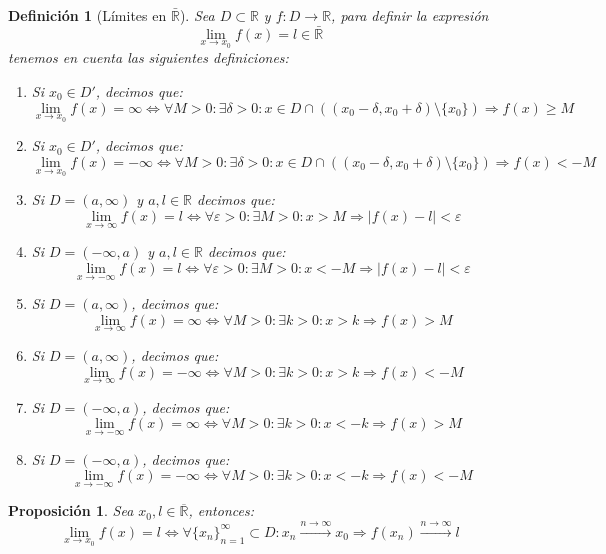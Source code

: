 \documentclass[10pt,a4paper,openright]{book}
\theoremstyle{break}
\newtheorem*{defi}{Definición}
\newtheorem*{prop}{Proposición}
\begin{document}
\begin{defi}[Límites en $\bar{\mathbb{R}}$]
Sea $D\subset \mathbb R$ y $f: D\longrightarrow \mathbb R$, para definir la expresión
$$\lim_{x\rightarrow x_0}f(x) = l \in \bar{\mathbb{R}}$$
tenemos en cuenta las siguientes definiciones:
\begin{enumerate}
\item Si $x_0\in D'$, decimos que:
$$\lim_{x\rightarrow x_0}f(x)=\infty\Leftrightarrow\forall M>0: \exists \delta>0: x\in D\cap \left((x_0-\delta, x_0+\delta)\mbox{\textbackslash}\{x_0\}\right)\Rightarrow f(x)\geq M$$

\item Si $x_0\in D'$, decimos que:
$$\lim_{x\rightarrow x_0}f(x)=-\infty \Leftrightarrow\forall M>0: \exists \delta>0: x\in D\cap \left((x_0-\delta, x_0+\delta)\mbox{\textbackslash}\{x_0\}\right)\Rightarrow f(x)<-M$$

\item Si $D=(a, \infty)$ y $a,l\in \mathbb R$ decimos que:
$$\lim_{x\rightarrow \infty}f(x)=l\Leftrightarrow \forall \varepsilon>0: \exists M>0: x>M\Rightarrow |f(x)-l|<\varepsilon$$

\item Si $D=(-\infty, a)$ y $a,l\in \mathbb R$ decimos que:
$$\lim_{x\rightarrow -\infty}f(x)=l\Leftrightarrow \forall \varepsilon>0: \exists M>0: x< -M\Rightarrow |f(x)-l|<\varepsilon$$

\item Si $D=(a,\infty)$, decimos que:
$$\lim_{x\rightarrow \infty}f(x)=\infty \Leftrightarrow \forall M>0: \exists k>0:  x>k \Rightarrow f(x)>M$$

\item Si $D=(a,\infty)$, decimos que:
$$\lim_{x\rightarrow \infty}f(x)=-\infty \Leftrightarrow \forall M>0: \exists k>0:  x>k \Rightarrow f(x)<-M$$

\item Si $D=(-\infty,a)$, decimos que:
$$\lim_{x\rightarrow -\infty}f(x)=\infty \Leftrightarrow \forall M>0: \exists k>0:  x<-k \Rightarrow f(x)>M$$

\item Si $D=(-\infty,a)$, decimos que:
$$\lim_{x\rightarrow -\infty}f(x)=-\infty \Leftrightarrow \forall M>0: \exists k>0:  x<-k \Rightarrow f(x)<-M$$
\end{enumerate}
\end{defi}

\begin{prop}
Sea $x_0, l\in \overline{\mathbb R}$, entonces:
$$\lim_{x\rightarrow x_0}f(x)=l\Leftrightarrow \forall\{x_n\}_{n=1}^\infty \subset D: x_n\xrightarrow{n\rightarrow \infty} x_0\Rightarrow f(x_n)\xrightarrow{n\rightarrow \infty} l$$
\end{prop}
\end{document}
